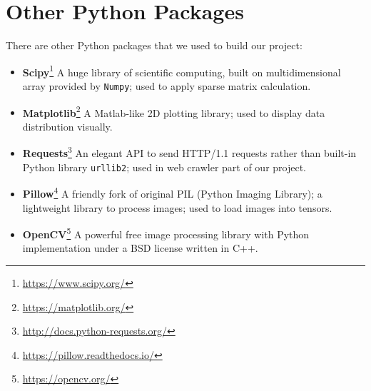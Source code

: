 \section{Other Python Packages}
There are other Python packages that we used to build our project:
\begin{itemize}
	\item \textbf{Scipy}\footnote{\url{https://www.scipy.org/}} A huge library of scientific computing, built on multidimensional array provided by \texttt{Numpy}; used to apply sparse matrix calculation.
	\item \textbf{Matplotlib}\footnote{\url{https://matplotlib.org/}} A Matlab-like 2D plotting library; used to display data distribution visually.
	\item \textbf{Requests}\footnote{\url{http://docs.python-requests.org/}} An elegant API to send HTTP/1.1 requests rather than built-in Python library \texttt{urllib2}; used in web crawler part of our project.
	\item \textbf{Pillow}\footnote{\url{https://pillow.readthedocs.io/}} A friendly fork of original PIL (Python Imaging Library); a lightweight library to process images; used to load images into tensors.
	\item \textbf{OpenCV}\footnote{\url{https://opencv.org/}} A powerful free image processing library with Python implementation under a BSD license written in C++.
\end{itemize}